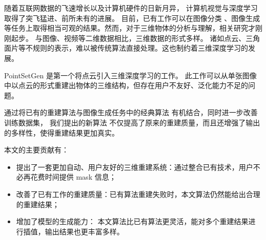 
\begin{cabstract}

	随着互联网数据的飞速增长以及计算机硬件的日新月异，
	计算机视觉与深度学习取得了突飞猛进、前所未有的进展。
	目前，已有工作可以在图像分类
	、图像生成等任务上取得相当可观的结果。然而，对于三维物体的分析与理解，相关研究才刚刚起步。
	与图像、视频等二维数据相比，三维数据的形式多样。
	诸如点云、三角面片等不规则的表示，难以被传统算法直接处理。这也制约着三维深度学习的发展。


	PointSetGen\cite{pointsetgen} 是第一个将点云引入三维深度学习的工作。
	此工作可以从单张图像中以点云的形式重建出物体的三维结构，但存在用户不友好、泛化能力不足的问题。


	通过将已有的重建算法与图像生成任务中的经典算法%
	有机结合，同时进一步改善训练数据集，
	我们提出的新算法
	不仅提高了原来的重建质量，而且还增强了输出的多样性，使得重建结果更加真实。

	本文的主要贡献有：
	\begin{itemize}
		\item 提出了一套更加自动、用户友好的三维重建系统：通过整合已有技术，用户不必再花费时间提供 mask 信息；
		\item 改善了已有工作的重建质量：已有算法重建失败时，本文算法仍然能给出合理的重建结果；
		\item 增加了模型的生成能力：%
		      本文算法比已有算法更灵活，能对多个重建结果进行插值，输出结果也更丰富多样。
	\end{itemize}

\end{cabstract}

